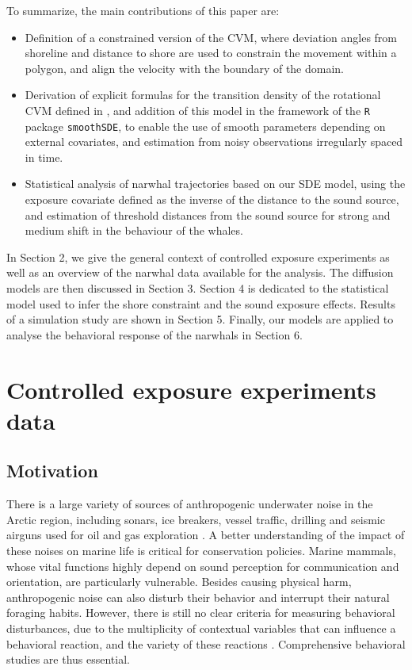 \documentclass[aoas]{imsart}
\theoremstyle{definition}
\theoremstyle{remark}
\theoremstyle{remark}
\newcommand {\1}{\mathbb{1}}
\begin{document}
To summarize, the main contributions of this paper are:
\begin{itemize}
	\item Definition of a constrained version of the CVM, where deviation angles from shoreline and distance to shore are used to constrain the movement within a polygon, and align the velocity with the boundary of the domain.
	\item Derivation of explicit formulas for the transition density of the rotational CVM defined in \citep{gurarie_correlated_2017}, and addition of this model in the framework of  the \texttt{R} package \texttt{smoothSDE}, to enable the use of smooth parameters depending on external covariates, and estimation from noisy observations irregularly spaced in time.
	\item Statistical analysis of narwhal trajectories based on our SDE model, using the exposure covariate defined as the inverse of the distance to the sound source, and estimation of threshold distances from the sound source for strong and medium shift in the behaviour of the whales.
\end{itemize}

In Section 2, we give the general context of controlled exposure experiments as well as an overview of the narwhal data available for the analysis.
The diffusion models are then discussed in Section 3. Section 4 is dedicated to the statistical model used to infer the shore constraint and the sound exposure effects. Results of a simulation study are shown in Section 5. Finally, our models are applied to analyse the behavioral response of the narwhals in Section 6.





\section{Controlled exposure experiments data}
\label{section: movement data}

\subsection{Motivation}
\label{subsection: controlled exposure experiments}

There is a large variety of sources of anthropogenic underwater noise in the Arctic region, including sonars, ice breakers, vessel traffic, drilling  and seismic airguns used for oil and gas exploration \citep{halliday_underwater_2020}.
A better understanding of the impact of these noises on marine life is critical for conservation policies. Marine mammals, whose vital functions highly depend on sound perception for communication and orientation, are particularly vulnerable. Besides causing physical harm, anthropogenic noise can also disturb their behavior and interrupt their natural foraging habits. However, there is still no clear criteria for measuring behavioral disturbances, due to the multiplicity of contextual variables that can influence a behavioral reaction, and the variety of these reactions \citep{southall_marine_2008,southall_marine_2019}. Comprehensive behavioral studies are thus essential.\\
\end{document}
